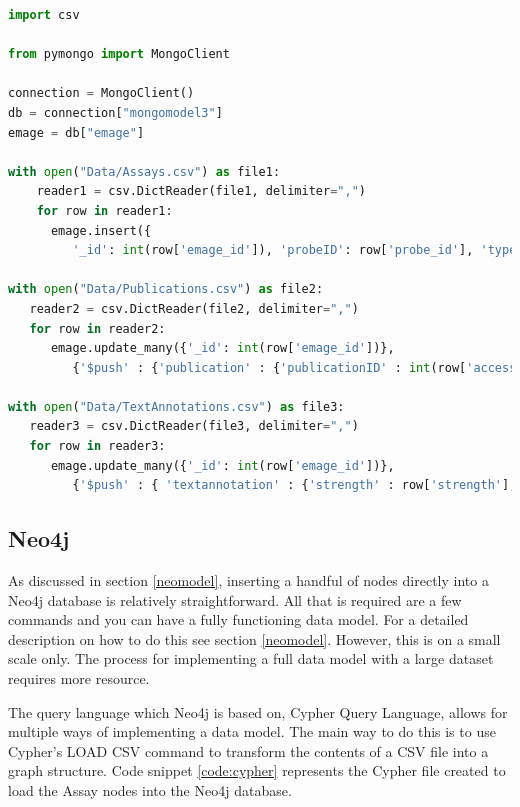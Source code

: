 \begin{lstlisting}[language=Python, caption=PyMongo script implemented to load data into MongoDB., label=code:pymongo]
import csv

from pymongo import MongoClient

connection = MongoClient()
db = connection["mongomodel3"]
emage = db["emage"]

with open("Data/Assays.csv") as file1:
    reader1 = csv.DictReader(file1, delimiter=",")
    for row in reader1:
      emage.insert({
         '_id': int(row['emage_id']), 'probeID': row['probe_id'], 'type': row['assay_type'], 'source': row['name'], 'specimen' : {'type':row['type'],'strain' : row['strain']}, 'stage' : {'theilerstage' : int(row['theilerstage']),'dpc' : row['dpc']}})
         
with open("Data/Publications.csv") as file2:
   reader2 = csv.DictReader(file2, delimiter=",")
   for row in reader2:
      emage.update_many({'_id': int(row['emage_id'])},
         {'$push' : {'publication' : {'publicationID' : int(row['accession']), 'title' : row['title'], 'author' : row['author']}}}, upsert=False)
         
with open("Data/TextAnnotations.csv") as file3:
   reader3 = csv.DictReader(file3, delimiter=",")
   for row in reader3:
      emage.update_many({'_id': int(row['emage_id'])},
         {'$push' : { 'textannotation' : {'strength' : row['strength'], 'anatomystructure' : {'structureID' : int(row['EMAPA']),'term' : row['term']}, 'gene' : {'geneID' : row['accession'],'name' : row['name']}}}}, upsert=False)
\end{lstlisting}
\vspace*{\fill}
\newpage
\subsection{Neo4j}\label{neoload}
As discussed in section \ref{neomodel}, inserting a handful of nodes directly into a Neo4j database is relatively straightforward. All that is required are a few commands and you can have a fully functioning data model. For a detailed description on how to do this see section \ref{neomodel}. However, this is on a small scale only. The process for implementing a full data model with a large dataset requires more resource.

The query language which Neo4j is based on, Cypher Query Language, allows for multiple ways of implementing a data model. The main way to do this is to use Cypher's LOAD CSV command to transform the contents of a CSV file into a graph structure. Code snippet \ref{code:cypher} represents the Cypher file created to load the Assay nodes into the Neo4j database. %

